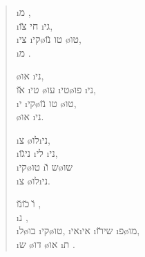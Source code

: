 
\newcommand{\level}{100}



\colInvisibone

\begin{verse}
	  \i{מ} ,\\
	\i{חי}  \u{צו} \i{גי},\\
	\i{צי} \i{קי}\o{טו} \u{נו} \o{טו},\\
	  \i{מ} .

	\o{או}  \i{ני},\\
	\u{או} \i{טי} \o{עו} \i{טי}\o{פו} \i{ני},\\
	\i{י} \i{קי}\o{טו} \u{נו} \o{טו},\\
	 \o{או}  \i{ני}.

	  \i{צ} \o{לו}\i{ני},\\
	 \i{ני}\u{גו} \i{לי}  \i{ני},\\
	\i{קי}\o{טו} \i{ש} \u{ו}\o{שו}\\
	  \i{צ} \o{לו}\i{ני}.

	\u{ו}  \u{כו}\u{נו}  ,\\
	\i{נ}    ,\\
	\i{ל}\o{בו} \i{קי}\o{טו}, \i{אי}\i{אי}  \i{שי}\u{רו}  \i{פ}\o{מו},\\
	\i{ש} \o{דו} \o{או} \i{ת} .
\end{verse}



